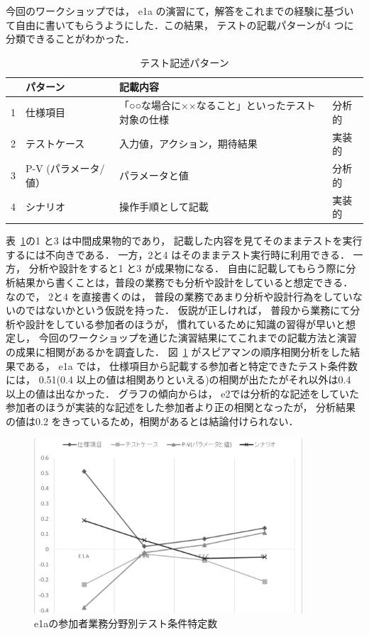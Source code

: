 \documentclass[a4paper,12pt]{jreport}
\begin{document}
今回のワークショップでは， e1a の演習にて，解答をこれまでの経験に基づいて自由に書いてもらうようにした．この結果， テストの記載パターンが4 つに分類できることがわかった．
\begin{table}[htbp]
  \centering
  \caption{テスト記述パターン}
    \begin{tabular}{|c|p{8.57em}|p{10.215em}|p{3.855em}|}
    \hline
          & \textbf{パターン} & \textbf{記載内容} & \multicolumn{1}{c|}{} \bigstrut\\
    \hline
    1     & 仕様項目  & 「○○な場合に××なること」といったテスト対象の仕様 & 分析的 \bigstrut\\
    \hline
    2     & テストケース & 入力値，アクション，期待結果 & 実装的 \bigstrut\\
    \hline
    3     & P-V
(パラメータ/値） & パラメータと値 & 分析的 \bigstrut[t]\\
    4     & シナリオ  & 操作手順として記載 & 実装的 \bigstrut[b]\\
    \hline
    \end{tabular}%
  \label{tbl:D-3-tbl11}%
\end{table}%

表~\ref{tbl:D-3-tbl11}の1 と3 は中間成果物的であり， 記載した内容を見てそのままテストを実行するには不向きである．
一方，2と4 はそのままテスト実行時に利用できる．
一方， 分析や設計をすると1 と3 が成果物になる．
自由に記載してもらう際に分析結果から書くことは，普段の業務でも分析や設計をしていると想定できる．
なので， 2と4 を直接書くのは， 普段の業務であまり分析や設計行為をしていないのではないかという仮説を持った．
仮説が正しければ， 普段から業務にて分析や設計をしている参加者のほうが， 慣れているために知識の習得が早いと想定し， 今回のワークショップを通じた演習結果にてこれまでの記載方法と演習の成果に相関があるかを調査した．
図~\ref{fig:D-3-Fig13} がスピアマンの順序相関分析をした結果である，
e1a では， 仕様項目から記載する参加者と特定できたテスト条件数には， 0.51(0.4 以上の値は相関ありといえる)の相関が出たたがそれ以外は0.4 以上の値は出なかった． グラフの傾向からは， e2では分析的な記述をしていた参加者のほうが実装的な記述をした参加者より正の相関となったが， 分析結果の値は0.2 をきっているため，相関があるとは結論付けられない．
\begin{figure}[h]
  \begin{center}
  \includegraphics[width=10cm]{./image/D-3-Fig13.png}
  \caption{e1aの参加者業務分野別テスト条件特定数}
  \label{fig:D-3-Fig13}
  \end{center}
   \end{figure}
\end{document}
